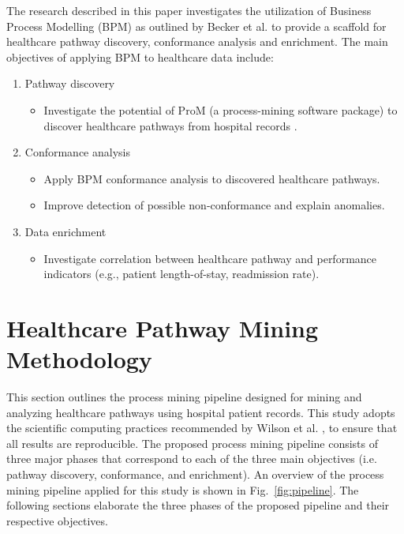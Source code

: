 The research described in this paper investigates the utilization of
Business Process Modelling (BPM) as outlined by Becker et
al.  to provide a scaffold for healthcare pathway
discovery, conformance analysis and enrichment.
The main objectives of applying BPM to healthcare data include:
\begin{enumerate}
    \item Pathway discovery
    \begin{itemize}
        \item Investigate the potential of ProM (a process-mining software package) to discover healthcare pathways from hospital records .
    \end{itemize}
    \item Conformance analysis
    \begin{itemize}
        \item Apply BPM conformance analysis to discovered healthcare pathways. 
        \item Improve detection of possible non-conformance and explain anomalies.
    \end{itemize}
    \item Data enrichment
    \begin{itemize}
        \item Investigate correlation between healthcare pathway and performance indicators (e.g., patient length-of-stay, readmission rate).
    \end{itemize}
\end{enumerate}

\section{Healthcare Pathway Mining Methodology}
This section outlines the process mining pipeline designed for mining and analyzing healthcare pathways using hospital patient records. This study adopts the scientific computing practices recommended by Wilson et al. \cite{Wilson2014}, \cite{Wilson2017} to ensure that all results are reproducible. The proposed process mining pipeline consists of three major phases that correspond to each of the three main objectives (i.e. pathway discovery, conformance, and enrichment). An overview of the process mining pipeline applied for this study is shown in Fig.~\ref{fig:pipeline}.  The following sections elaborate the three phases of the proposed pipeline and their respective objectives.

